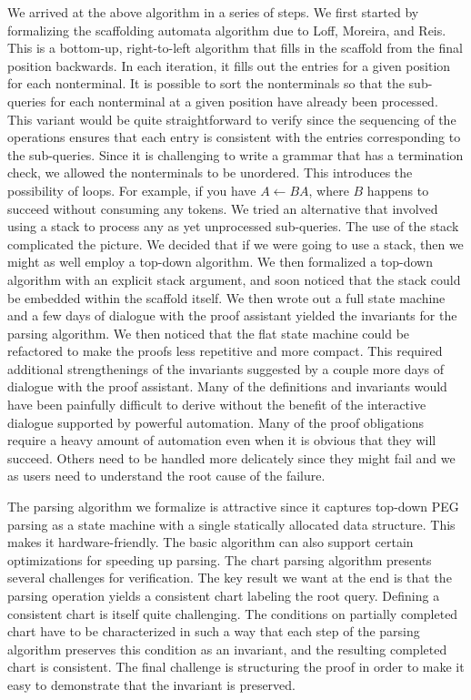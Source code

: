\documentclass[sigplan,10pt,anonymous,review]{acmart}\settopmatter{printfolios=true,printccs=false,printacmref=false}
\begin{document}
\begin{CCSXML}
We arrived at the above algorithm in a series of steps.  We first
started by formalizing the scaffolding automata algorithm due to Loff,
Moreira, and Reis.  This is a bottom-up, right-to-left algorithm that
fills in the scaffold from the final position backwards.  In each
iteration, it fills out the entries for a given position for each
nonterminal.  It is possible to sort the nonterminals so that the
sub-queries for each nonterminal at a given position have already been
processed.  This variant would be quite straightforward to verify
since the sequencing of the operations ensures that each entry is
consistent with the entries corresponding to the sub-queries.  Since
it is challenging to write a grammar that has a termination check, we
allowed the nonterminals to be unordered.  This introduces the
possibility of loops.  For example, if you have $A \leftarrow B A$,
where $B$ happens to succeed without consuming any tokens.  We tried
an alternative that involved using a stack to process any as yet
unprocessed sub-queries.  The use of the stack complicated the
picture.  We decided that if we were going to use a stack, then we
might as well employ a top-down algorithm.  We then formalized a
top-down algorithm with an explicit stack argument, and soon noticed
that the stack could be embedded within the scaffold itself.  We then
wrote out a full state machine and a few days of dialogue with the
proof assistant yielded the invariants for the parsing algorithm.  We
then noticed that the flat state machine could be refactored to make
the proofs less repetitive and more compact.  This required additional
strengthenings of the invariants suggested by a couple more days of
dialogue with the proof assistant.  Many of the definitions and
invariants would have been painfully difficult to derive without the
benefit of the interactive dialogue supported by powerful automation.
Many of the proof obligations require a heavy amount of automation
even when it is obvious that they will succeed.  Others need to be
handled more delicately since they might fail and we as users need to
understand the root cause of the failure.  



The parsing algorithm we formalize is attractive since it captures
top-down PEG parsing as a state machine with a single statically
allocated data structure.  This makes it hardware-friendly.  The basic
algorithm can also support certain optimizations for speeding up parsing.
The chart parsing algorithm presents several challenges for verification.
The key result we want at the end is that the parsing operation
yields a consistent chart labeling the root query.  Defining a consistent
chart is itself quite challenging.  The conditions on partially
completed chart have to be characterized in such a way that each step
of the parsing algorithm preserves this condition as an invariant, and
the resulting completed chart is consistent.  The final challenge is
structuring the proof in order to make it easy to demonstrate that the
invariant is preserved.  





\end{CCSXML}
\end{document}
